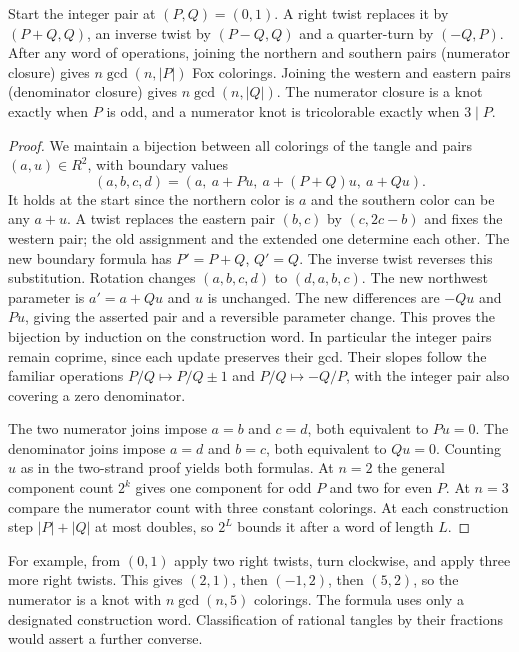 \begin{theorem}
Start the integer pair at $(P,Q)=(0,1)$. A right twist replaces it by
$(P+Q,Q)$, an inverse twist by $(P-Q,Q)$ and a quarter-turn by
$(-Q,P)$. After any word of operations, joining the northern and southern
pairs (numerator closure) gives $n\gcd(n,|P|)$ Fox colorings.
Joining the western and eastern pairs (denominator closure) gives
$n\gcd(n,|Q|)$. The numerator closure is a knot exactly when $P$ is odd,
and a numerator knot is tricolorable exactly when $3\mid P$.
\end{theorem}
\begin{proof}
We maintain a bijection between all colorings of the tangle and pairs
$(a,u)\in R^2$, with boundary values
\[
 (a,b,c,d)=(a,\ a+Pu,\ a+(P+Q)u,\ a+Qu).
\]
It holds at the start since the northern color is $a$ and the southern
color can be any $a+u$. A twist replaces the eastern pair $(b,c)$ by
$(c,2c-b)$ and fixes the western pair; the old assignment and the
extended one determine each other. The new boundary formula has
$P'=P+Q$, $Q'=Q$. The inverse twist reverses this substitution.
Rotation changes $(a,b,c,d)$ to $(d,a,b,c)$. The new northwest parameter
is $a'=a+Qu$ and $u$ is unchanged. The new differences are $-Qu$ and
$Pu$, giving the asserted pair and a reversible parameter change.
This proves the bijection by induction on the construction word.
In particular the integer pairs remain coprime, since each update
preserves their gcd. Their slopes follow the familiar operations
$P/Q\mapsto P/Q\pm1$ and $P/Q\mapsto -Q/P$, with the integer pair
also covering a zero denominator.

The two numerator joins impose $a=b$ and $c=d$, both equivalent to
$Pu=0$. The denominator joins impose $a=d$ and $b=c$, both equivalent
to $Qu=0$. Counting $u$ as in the two-strand proof yields both formulas.
At $n=2$ the general component count $2^k$ gives one component for
odd $P$ and two for even $P$. At $n=3$ compare the numerator count with
three constant colorings. At each construction step $|P|+|Q|$ at most
doubles, so $2^L$ bounds it after a word of length $L$.
\end{proof}

For example, from $(0,1)$ apply two right twists, turn clockwise, and
apply three more right twists. This gives $(2,1)$, then $(-1,2)$, then
$(5,2)$, so the numerator is a knot with $n\gcd(n,5)$ colorings.
The formula uses only a designated construction word. Classification
of rational tangles by their fractions would assert a further converse.

